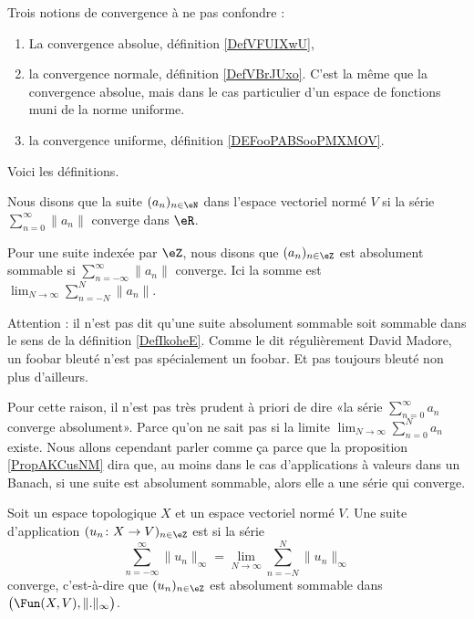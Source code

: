 Trois notions de convergence à ne pas confondre :
\begin{enumerate}
	\item
	      La convergence absolue, définition \ref{DefVFUIXwU},			%
	\item
	      la convergence normale, définition \ref{DefVBrJUxo}. C'est la même que la convergence absolue, mais dans le cas particulier d'un espace de fonctions muni de la norme uniforme.
	\item
	      la convergence uniforme, définition \ref{DEFooPABSooPMXMOV}.		%
\end{enumerate}
Voici les définitions.

\begin{definition} \label{DefVFUIXwU}
	Nous disons que la suite \( (a_n)_{n\in \eN}\) dans l'espace vectoriel normé \( V\)  si la série \( \sum_{n=0}^{\infty}\| a_n \|\) converge dans \( \eR\).

	Pour une suite indexée par \( \eZ\), nous disons que \( (a_n)_{n\in \eZ}\) est absolument sommable si \( \sum_{n=-\infty}^{\infty}\| a_n \|\) converge. Ici la somme est \( \lim_{N\to \infty}\sum_{n=-N}^N\| a_n \|\).
\end{definition}

Attention : il n'est pas dit qu'une suite absolument sommable soit sommable dans le sens de la définition \ref{DefIkoheE}. Comme le dit régulièrement David Madore, un foobar bleuté n'est pas spécialement un foobar. Et pas toujours bleuté non plus d'ailleurs.

Pour cette raison, il n'est pas très prudent à priori de dire «la série \( \sum_{n=0}^{\infty}a_n\) converge absolument». Parce qu'on ne sait pas si la limite \( \lim_{N\to \infty}\sum_{n=0}^Na_n\) existe. Nous allons cependant parler comme ça parce que la proposition \ref{PropAKCusNM} dira que, au moins dans le cas d'applications à valeurs dans un Banach, si une suite est absolument sommable, alors elle a une série qui converge.

\begin{definition} \label{DefVBrJUxo}
	Soit un espace topologique \( X\) et un espace vectoriel normé \( V\). Une suite d'application \( (u_n \colon X\to V)_{n\in \eZ}  \) est  si la série
	\begin{equation}
		\sum_{n=-\infty}^{\infty}\| u_n \|_{\infty}=\lim_{N\to \infty}\sum_{n=-N}^N\| u_n \|_{\infty}
	\end{equation}
	converge, c'est-à-dire que \( (u_n)_{n\in \eZ}\) est absolument sommable dans \( \big( \Fun(X,V), \| . \|_{\infty} \big)\).
\end{definition}

